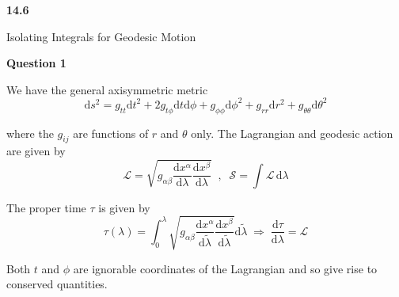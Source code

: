 \documentclass[12pt]{extarticle}
\begin{document}
\begin{flushleft}
\begin{LARGE}
\textbf{14.6}
\end{LARGE}  
\end{flushleft}

\vfill
\begin{center}
\begin{Huge}
Isolating Integrals for Geodesic Motion
\end{Huge}
\end{center}
\vfill

\pagebreak

\begin{center}
\textbf{Question 1}
\end{center}

We have the general axisymmetric metric 
$$\mathrm{d}s^2 = g_{tt}\mathrm{d}t^2+2g_{t\phi}\mathrm{d}t \mathrm{d}\phi +g_{\phi \phi} \mathrm{d}\phi ^2+g_{rr}\mathrm{d}r^2+g_{\theta \theta}\mathrm{d}\theta^2$$

where the $g_{i j}$ are functions of $r$ and $\theta$ only. The Lagrangian and geodesic action are given by
$$\mathcal{L} = \sqrt{g_{\alpha \beta}\frac{\mathrm{d}x^\alpha}{\mathrm{d}\lambda}\frac{\mathrm{d}x^\beta}{\mathrm{d}\lambda}} \;\;,\;\; \mathcal{S} = \int \mathcal{L}\, \mathrm{d}\lambda$$

The proper time $\tau$ is given by 
$$\tau (\lambda) = \int_{0}^{\lambda} \sqrt{g_{\alpha \beta}\frac{\mathrm{d}x^\alpha}{\mathrm{d}\tilde{\lambda}}\frac{\mathrm{d}x^\beta}{\mathrm{d}\tilde{\lambda}}} \mathrm{d}\tilde{\lambda}
\; \Rightarrow \; \frac{\mathrm{d}\tau}{\mathrm{d}\lambda} = \mathcal{L}$$

Both $t$ and $\phi$ are ignorable coordinates of the Lagrangian and so give rise to conserved quantities. 
\end{document}
